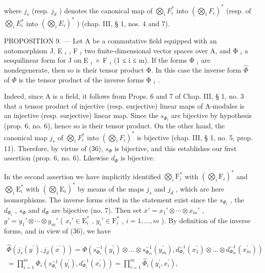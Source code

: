 where \(j_s\) (resp. \(j_d\) ) denotes the canonical map of \(\bigotimes_i F_i^*\) into \((\bigotimes_i F_i)^*\) (resp. of \(\bigotimes_i E_i^*\) into \((\bigotimes_i E_i)^*\) ) (chap. III, § 1, nos. 4 and 7).

PROPOSITION 9. — Let A be a commutative field equipped with an automorphism J, E \(_{i}\) , F \(_{i}\) two finite-dimensional vector spaces over A, and Φ \(_{i}\) a sesquilinear form for J on E \(_{i}\) × F \(_{i}\) (1 ≤ i ≤ m). If the forms Φ \(_{i}\) are nondegenerate, then so is their tensor product Φ. In this case the inverse form \(\hat{\Phi}\) of \(\Phi\) is the tensor product of the inverse forms Φ \(_{i}\) .

Indeed, since A is a field, it follows from Props. 6 and 7 of Chap. III, § 1, no. 3 that a tensor product of injective (resp. surjective) linear maps of A-modules is an injective (resp. surjective) linear map. Since the \(s_{\Phi_i}\) are bijective by hypothesis (prop. 6, no. 6), hence so is their tensor product. On the other hand, the canonical map \(j_s\) of \(\bigotimes_i F_i^*\) into \((\bigotimes_i F_i)^*\) is bijective (chap. III, § 1, no. 5, prop. 11). Therefore, by virtue of (36), \(s_\Phi\) is bijective, and this establishes our first assertion (prop. 6, no. 6). Likewise \(d_\Phi\) is bijective.

In the second assertion we have implicitly identified \(\bigotimes_{i} \mathrm{F}_{i}^{*}\) with \((\bigotimes_{i} \mathrm{F}_{i})^{*}\) and \(\bigotimes_{i} \mathrm{E}_{i}^{*}\) with \((\bigotimes_{i} \mathrm{E}_{i})^{*}\) by means of the maps \(j_{s}\) and \(j_{d}\) , which are here isomorphisms. The inverse forms cited in the statement exist since the \(s_{\Phi_{i}}\) , the \(d_{\Phi_{i}}\) , \(s_{\Phi}\) and \(d_{\Phi}\) are bijective (no. 7). Then set \(x' = x_{1}' \otimes \cdots \otimes x_{m}'\) , \(y' = y_{1}' \otimes \cdots \otimes y_{m}'\) ( \(x_{i}' \in \mathrm{E}_{i}^{*}\) , \(y_{i}' \in \mathrm{F}_{i}^{*}\) , \(i = 1, \ldots, m\) ). By definition of the inverse forms, and in view of (36), we have

\[
\begin{array}{l} \widehat {\Phi} (j _ {s} (y ^ {\prime}), j _ {d} (x ^ {\prime})) = \Phi (s _ {\Phi_ {1}} ^ {- 1} (y _ {1} ^ {\prime}) \otimes \dots \otimes s _ {\Phi_ {m}} ^ {- 1} (y _ {m} ^ {\prime}), d _ {\Phi_ {1}} ^ {- 1} (x _ {1} ^ {\prime}) \otimes \dots \otimes d _ {\Phi_ {m}} ^ {- 1} (x _ {m} ^ {\prime})) \\ = \prod_ {i = 1} ^ {m} \Phi_ {i} (s _ {\Phi_ {i}} ^ {- 1} (y _ {i} ^ {\prime}), d _ {\Phi_ {i}} ^ {- 1} (x _ {i} ^ {\prime})) = \prod_ {i = 1} ^ {m} \widehat {\Phi} _ {i} (y _ {i} ^ {\prime}, x _ {i} ^ {\prime}), \end{array}
\]

